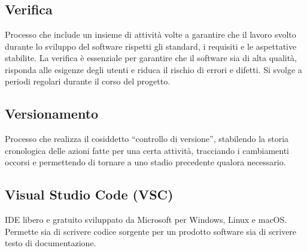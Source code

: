 
\section{}

\hypertarget{sec:verifica}{}
\subsection*{Verifica}
Processo che include un insieme di attività volte a garantire che il lavoro svolto durante lo sviluppo del software rispetti gli standard, i requisiti e 
le aspettative stabilite. La verifica è essenziale per garantire che il software sia di alta qualità, risponda alle esigenze degli utenti e riduca il 
rischio di errori e difetti. Si svolge a periodi regolari durante il corso del progetto.

\subsection*{Versionamento}
Processo che realizza il cosiddetto “controllo di versione”, stabilendo la storia cronologica delle azioni fatte per una certa attività, tracciando i 
cambiamenti occorsi e permettendo di tornare a uno stadio precedente qualora necessario.

\hypertarget{sec:VSC}{}
\subsection*{Visual Studio Code (VSC)}
IDE libero e gratuito sviluppato da Microsoft per Windows, Linux e macOS. Permette sia di scrivere codice 
sorgente per un prodotto software sia di scrivere testo di documentazione.

\newpage